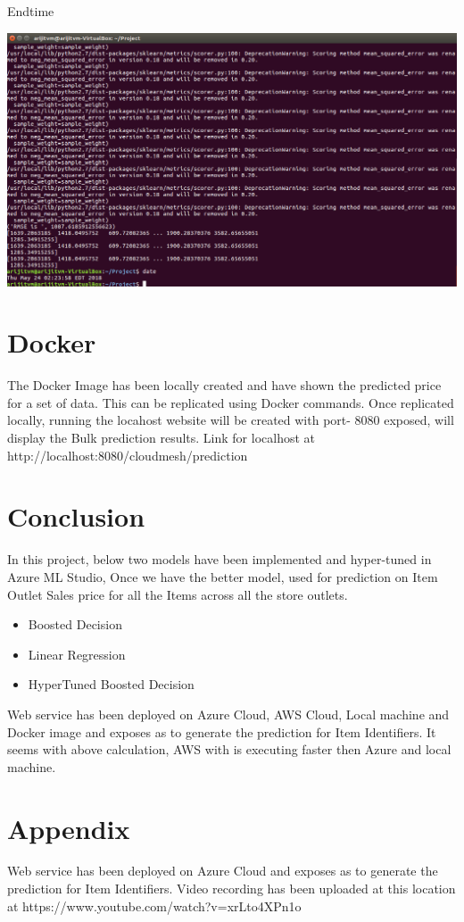 Endtime 

\includegraphics[width=\columnwidth]{Images/EndTimelocal.png}


\section{Docker}

The Docker Image has been locally created and have shown the predicted 
price for a set of data. This can be replicated using Docker commands. 
Once replicated locally, running the locahost website will be created 
with port- 8080 exposed, will display the Bulk prediction results.
Link for localhost at http://localhost:8080/cloudmesh/prediction

\section{Conclusion}

In this project, below two models have been implemented and 
hyper-tuned in Azure ML Studio, Once we have the better model, used for 
prediction on Item Outlet Sales price for all the Items 
across all the store outlets.
\begin{itemize}
\item Boosted Decision
\item Linear Regression
\item HyperTuned Boosted Decision
\end{itemize}
Web service has been deployed on Azure Cloud, AWS Cloud, Local machine 
and Docker image and exposes 
as to generate the prediction for Item Identifiers. It seems with above 
calculation, AWS with is executing faster then Azure and local machine.

\section{Appendix}

Web service has been deployed on Azure Cloud and exposes as to generate 
the prediction for Item Identifiers.
Video recording has been uploaded at this location at 
https://www.youtube.com/watch?v=xrLto4XPn1o




 
